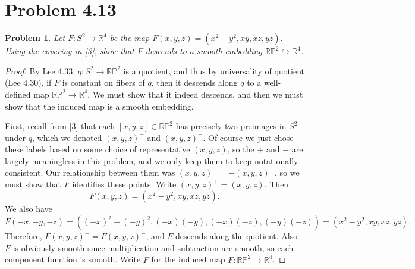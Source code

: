 \documentclass[11pt, letterpaper]{article}
\theoremstyle{plain}
\newtheorem{problem}{Problem}[section]
\begin{document}
\section{Problem 4.13}

\begin{problem}
	Let $F : S^2 \to \mathbb{R} ^4$ be the map $F(x,y,z)=(x^2-y^2,xy,xz,yz)$. Using the covering in \cref{3}, show that $F$ descends to a smooth embedding $\mathbb{R} \mathbb{P} ^2\hookrightarrow \mathbb{R} ^4$.
\end{problem}
\begin{proof}
	By Lee 4.33, $q : S^2 \to \mathbb{R} \mathbb{P} ^2$ is a quotient, and thus by universality of quotient (Lee 4.30), if $F$ is constant on fibers of $q$, then it descends along $q$ to a well-defined map $\mathbb{R} \mathbb{P} ^2\to \mathbb{R} ^4$. We must show that it indeed descends, and then we must show that the induced map is a smooth embedding.

	First, recall from \cref{3} that each $[x,y,z]\in\mathbb{R} \mathbb{P} ^2$ has precisely two preimages in $S^2$ under $q$, which we denoted $(x,y,z)^+$ and $(x,y,z)^-$. Of course we just chose these labels based on some choice of representative $(x,y,z)$, so the $+$ and $-$ are largely meaningless in this problem, and we only keep them to keep notationally consistent. Our relationship between them was $(x,y,z)^-=-(x,y,z)^+$, so we must show that $F$ identifies these points. Write $(x,y,z)^{+} =(x,y,z)$. Then
	\[
		F(x,y,z)=(x^2-y^2,xy,xz,yz)
	.\]
	We also have
	\[
	F(-x,-y,-z)=\left( (-x)^2-(-y)^2,(-x)(-y),(-x)(-z),(-y)(-z) \right) =(x^2-y^2,xy,xz,yz)
	.\]
	Therefore, $F(x,y,z)^+=F(x,y,z)^-$, and $F$ descends along the quotient. Also $F$ is obviously smooth since multiplication and subtraction are smooth, so each component function is smooth. Write $\widetilde{F} $ for the induced map $F : \mathbb{R} \mathbb{P} ^2 \to \mathbb{R} ^4$.


\end{proof}
\end{document}
